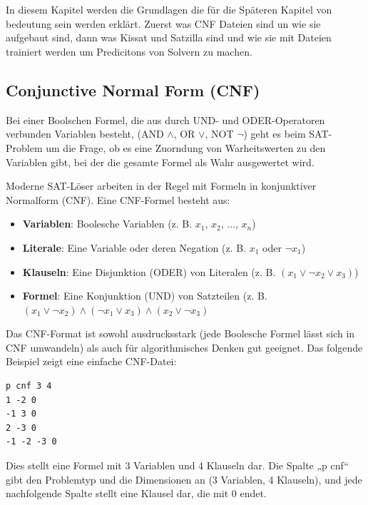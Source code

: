 \section{}\label{sec:preliminaries}

In diesem Kapitel werden die Grundlagen die für die Späteren Kapitel von bedeutung sein werden erklärt.
Zuerst was CNF Dateien sind un wie sie aufgebaut sind, dann was Kissat und Satzilla sind und wie sie mit 
Dateien trainiert werden um Predicitons von Solvern zu machen.

\subsection{Conjunctive Normal Form (CNF)}

Bei einer Boolschen Formel, die aus durch UND- und ODER-Operatoren verbunden Variablen 
besteht, (AND $\land$, OR $\lor$, NOT $\neg$) geht es beim SAT-Problem um die Frage, ob es eine Zuorndung von 
Warheitswerten zu den Variablen gibt, bei der die gesamte Formel als Wahr ausgewertet wird.

Moderne SAT-Löser arbeiten in der Regel mit Formeln in konjunktiver Normalform (CNF). Eine CNF-Formel 
besteht aus:

\begin{itemize}
    \setlength{\itemsep}{0pt}
    \setlength{\parskip}{0pt}
    \setlength{\parsep}{0pt}
    \item \textbf{Variablen}: Boolesche Variablen (z. B. $x_1$, $x_2$, ..., $x_n$)
    \item \textbf{Literale}: Eine Variable oder deren Negation (z. B. $x_1$ oder $\neg x_1$)
    \item \textbf{Klauseln}: Eine Disjunktion (ODER) von Literalen (z. B. $(x_1 \lor \neg x_2 \lor x_3)$)
    \item \textbf{Formel}: Eine Konjunktion (UND) von Satzteilen (z. B. $(x_1 \lor \neg x_2) \land (\neg x_1 \lor x_3) \land (x_2 \lor \neg x_3)$
\end{itemize}

Das CNF-Format ist sowohl ausdrucksstark (jede Boolesche Formel lässt sich in CNF umwandeln) als auch für 
algorithmisches Denken gut geeignet. Das folgende Beispiel zeigt eine einfache CNF-Datei:

\begin{verbatim}
p cnf 3 4
1 -2 0
-1 3 0
2 -3 0
-1 -2 -3 0
\end{verbatim}

Dies stellt eine Formel mit 3 Variablen und 4 Klauseln dar. Die Spalte „p cnf“ gibt den Problemtyp und die 
Dimensionen an (3 Variablen, 4 Klauseln), und jede nachfolgende Spalte stellt eine Klausel dar, die mit 0 
endet.

